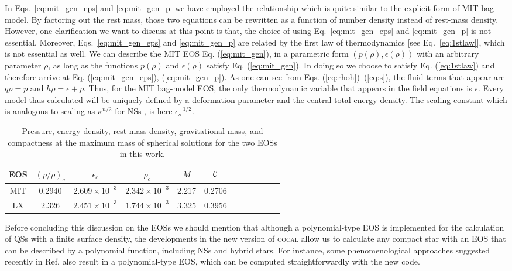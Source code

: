 \documentclass[twocolumn,superscriptaddress,showpacs,prd,aps,amsmath,amssymb,nofootinbib]{revtex4-1}
\newcommand{\cocal}{\textsc{cocal}}
\begin{document}
In Eqs.~\eqref{eq:mit_gen_eps} and \eqref{eq:mit_gen_p} we have employed
the relationship which is quite similar to the explicit form of MIT bag
model. By factoring out the rest mass, those two equations can be rewritten
as a function of number density instead of rest-mass density. However,
one clarification we want to discuss at this point is that, the choice of
using Eq.~\eqref{eq:mit_gen_eps} and \eqref{eq:mit_gen_p} is not
essential. Moreover, Eqs.~\eqref{eq:mit_gen_eps} and
  \eqref{eq:mit_gen_p} are related by the first law of thermodynamics [see
  Eq.~\eqref{eq:1stlaw}], which is not essential as well. We can describe
the MIT EOS Eq. (\ref{eq:mit_gen}), in a parametric form
$(p(\rho),\epsilon(\rho))$ with an arbitrary parameter $\rho$, as long as
the functions $p(\rho)$ and $\epsilon(\rho)$ satisfy
Eq. (\ref{eq:mit_gen}). In doing so we choose to satisfy
Eq. (\ref{eq:1stlaw}) and therefore arrive at Eq. (\ref{eq:mit_gen_eps}),
(\ref{eq:mit_gen_p}). As one can see from
Eqs. (\ref{eq:rhoh})--(\ref{eq:s}), the fluid terms that appear are
$q\rho=p$ and $h\rho=\epsilon+p$. Thus, for the MIT bag-model EOS, the
only thermodynamic variable that appears in the field equations is
$\epsilon$. Every model thus calculated will be uniquely defined by a
deformation parameter and the central total energy density. The scaling
constant which is analogous to scaling as $\kappa^{n/2}$ for NSs
\cite{Rezzolla_book:2013}, is here $\epsilon_s^{-1/2}$.




\begin{table}
\begin{tabular}{cccccccccccc}
\hline
EOS & $(p/\rho)_c$ & $\epsilon_c$ & $\rho_c$ & $M$ & $\mathcal{C}$ \\
\hline
MIT& 0.2940 & $2.609\times10^{-3}$ & 	$2.342\times10^{-3}$ & 	2.217 & 	0.2706 & 	 \\
LX& 2.326 & $2.451\times10^{-3}$	& $1.744\times10^{-3}$ & 3.325	 & 	0.3956 & 	 \\
\hline
\end{tabular}
\caption{Pressure, energy density, rest-mass density, gravitational mass,
  and compactness at the maximum mass of spherical solutions for the two
  EOSs in this work.}
\label{tab:tovmax}
\end{table}

Before concluding this discussion on the EOSs we should mention that
although a polynomial-type EOS is implemented for the calculation of QSs
with a finite surface density, the developments in the new version of
\cocal{} allow us to calculate any compact star with an EOS that can be
described by a polynomial function, including NSs and hybrid stars. For
instance, some phenomenological approaches suggested recently in
Ref. \cite{Baym2017} also result in a polynomial-type EOS, which can be
computed straightforwardly with the new code.
\end{document}
